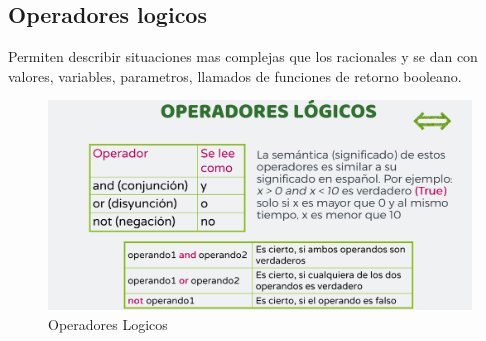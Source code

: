 \documentclass{article}
\begin{document}
\subsection{Operadores logicos}
Permiten describir situaciones mas complejas que los racionales y se dan con valores, variables, parametros, llamados de funciones de retorno booleano.
\begin{figure}[H]
    \centering
    \includegraphics[width=1\linewidth]{OperadoresLogicos.png}
    \caption{Operadores Logicos}
    \label{fig:enter-label}
\end{figure}
\end{document}
